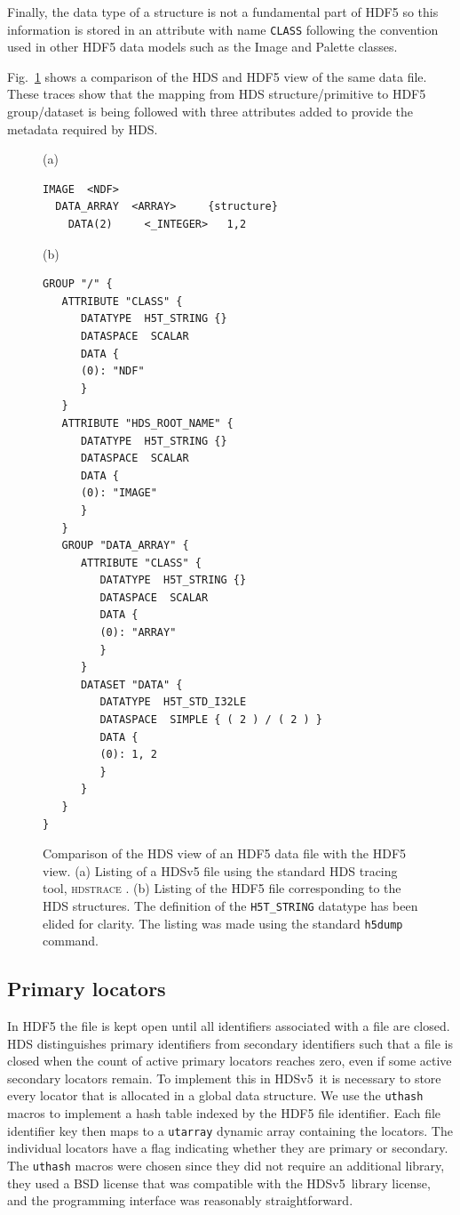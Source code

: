 \documentclass[final,authoryear,5p,times,twocolumn]{elsarticle}
\newcommand{\new}{HDSv5}
\begin{document}
Finally, the data type of a structure is not a fundamental part of
HDF5 so this information is stored in an attribute with name
\texttt{CLASS} following the convention used in other HDF5 data models
such as the Image and Palette classes.

Fig.~\ref{fig:compare} shows a comparison of the HDS and HDF5 view of
the same data file.  These traces show that the mapping from HDS
structure/primitive to HDF5 group/dataset is being followed with three
attributes added to provide the metadata required by HDS.


\begin{figure}[!ht]
\small
(a)
\begin{verbatim}
IMAGE  <NDF>
  DATA_ARRAY  <ARRAY>     {structure}
    DATA(2)     <_INTEGER>   1,2
\end{verbatim}
(b)
\begin{verbatim}
GROUP "/" {
   ATTRIBUTE "CLASS" {
      DATATYPE  H5T_STRING {}
      DATASPACE  SCALAR
      DATA {
      (0): "NDF"
      }
   }
   ATTRIBUTE "HDS_ROOT_NAME" {
      DATATYPE  H5T_STRING {}
      DATASPACE  SCALAR
      DATA {
      (0): "IMAGE"
      }
   }
   GROUP "DATA_ARRAY" {
      ATTRIBUTE "CLASS" {
         DATATYPE  H5T_STRING {}
         DATASPACE  SCALAR
         DATA {
         (0): "ARRAY"
         }
      }
      DATASET "DATA" {
         DATATYPE  H5T_STD_I32LE
         DATASPACE  SIMPLE { ( 2 ) / ( 2 ) }
         DATA {
         (0): 1, 2
         }
      }
   }
}
\end{verbatim}
\caption{Comparison of the HDS view of an HDF5 data file with the HDF5
  view.
  (a) Listing of a HDSv5 file using the standard HDS tracing tool,
  \textsc{hdstrace} \citep{SUN102}.
  (b) Listing of the HDF5 file corresponding to the HDS structures.
  The definition of the
  \texttt{H5T\_STRING} datatype has been elided for clarity. The
  listing was made using the standard \texttt{h5dump} command.
}
\label{fig:compare}
\end{figure}

\subsection{Primary locators}

In HDF5 the file is kept open until all identifiers associated with a
file are closed. HDS distinguishes primary identifiers from secondary
identifiers such that a file is closed when the count of active
primary locators reaches zero, even if some active secondary locators
remain. To implement this in
\new\ it is necessary to store every locator that is allocated in a
global data structure. We use the \texttt{uthash} macros \citep{uthash} to
implement a hash table indexed by the HDF5 file identifier. Each
file identifier key then maps to a \texttt{utarray} dynamic array
containing the locators. The individual locators have a flag indicating
whether they are primary or secondary.
The \texttt{uthash} macros were
chosen since they did not require an additional library, they used a
BSD license that was compatible with the \new\ library license, and
the programming interface was reasonably straightforward.
\end{document}
